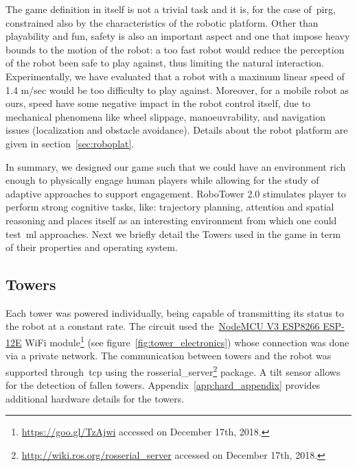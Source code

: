 The game definition in itself is not a trivial task and it is, for the case of~\gls{pirg}, constrained also by the characteristics of the robotic platform. Other than playability and fun, safety is also an important aspect and one that impose heavy bounds to the motion of the robot: a too fast  robot would reduce the perception of the robot been safe to play against, thus limiting the natural interaction. Experimentally, we have evaluated that a robot with a maximum linear speed of 1.4 m/sec would be too difficulty to play against. Moreover, for a mobile robot as ours, speed have some negative impact in the robot control itself, due to mechanical phenomena like wheel slippage, manoeuvrability, and navigation issues (localization and obstacle avoidance). Details about the robot platform are given in section~\ref{sec:roboplat}.

In summary, we designed our game such that we could have an environment rich enough to physically engage human players while allowing for the study of adaptive approaches to support engagement. RoboTower 2.0 stimulates player to perform strong cognitive tasks, like: trajectory planning, attention and spatial reasoning and places itself as an interesting environment from which one could test~\gls{ml} approaches. Next we briefly detail the Towers used in the game in term of their properties and operating system.


\subsection{Towers}\label{sec:towers}
Each tower was powered individually, being capable of transmitting its status to the robot at a constant rate. The circuit used the~\href{https://einstronic.com/wp-content/uploads/2017/06/NodeMCU-ESP8266-ESP-12E-Catalogue.pdf}{NodeMCU V3 ESP8266 ESP-12E} WiFi module\footnote{\url{https://goo.gl/TzAjwi} accessed on December 17th, 2018.} (see figure~\ref{fig:tower_electronics}) whose connection was done via a private network. The communication between towers and the robot was supported through~\gls{tcp} using the rosserial\_server\footnote{\url{http://wiki.ros.org/rosserial_server} accessed on December 17th, 2018.} package. A tilt sensor allows for the detection of fallen towers. Appendix~\ref{app:hard_appendix} provides additional hardware details for the towers. 

